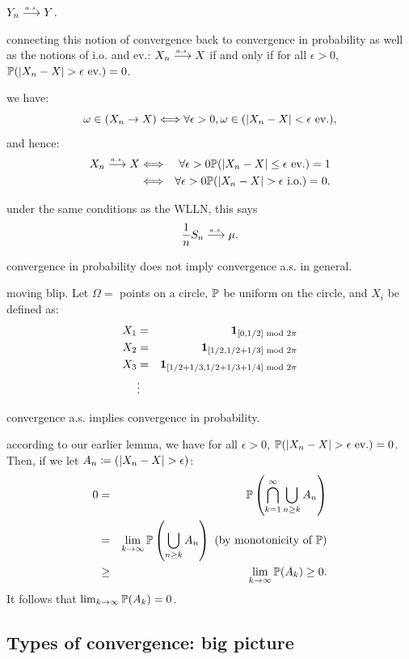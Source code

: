 \documentclass{article}
\begin{document}
 $Y_n \ascv Y$.

 connecting this notion of convergence back to convergence in probability as well as the notions of i.o. and ev.: $X_n \ascv X$ if and only if for all $\epsilon > 0$, $\P(|X_n - X| > \epsilon\ev) = 0$.

 we have: \[\omega \in (X_n \to X) \Longleftrightarrow \forall \epsilon>0, \omega\in (|X_n-X| < \epsilon \ev),\] and hence:
\begin{eqnarray*}
X_n \ascv X &\Longleftrightarrow& \forall \epsilon >0 \P(|X_n - X| \le \epsilon \ev) = 1 \\
&\Longleftrightarrow& \forall \epsilon > 0 \P(|X_n - X| > \epsilon \io) = 0.
\end{eqnarray*}

 under the same conditions as the WLLN, this says \[ \frac{1}{n} S_n \ascv \mu. \]

 convergence in probability does not imply convergence a.s. in general.

 moving blip. Let $\Omega = $ points on a circle, $\P$ be uniform on the circle, and $X_i$ be defined as:
\begin{eqnarray*}
X_1 &=& \1_{[0,1/2]\text{ mod }2\pi}\\
X_2 &=& \1_{[1/2,1/2+1/3]\text{ mod }2\pi}\\
X_3 &=& \1_{[1/2+1/3,1/2+1/3+1/4]\text{ mod }2\pi}\\
&\vdots&
\end{eqnarray*}

 convergence a.s. implies convergence in probability.

 according to our earlier lemma, we have for all $\epsilon > 0$, $\P(|X_n - X| > \epsilon\ev) = 0$. Then, if we let $A_n \defeq (|X_n - X| > \epsilon)$:
\begin{eqnarray*}
0 &=& \P\left( \bigcap_{k=1}^\infty \bigcup_{n \ge k} A_n \right) \\
&=& \lim_{k\to\infty} \P\left( \bigcup_{n\ge k} A_n \right) \text{ (by monotonicity of }\P\text{)} \\
&\ge& \lim_{k\to\infty} \P(A_k) \ge 0.
\end{eqnarray*}
It follows that $\lim_{k\to\infty} \P(A_k) = 0$.


\subsection{Types of convergence: big picture}\label{sec:conv-types-big-picture}
\end{document}
